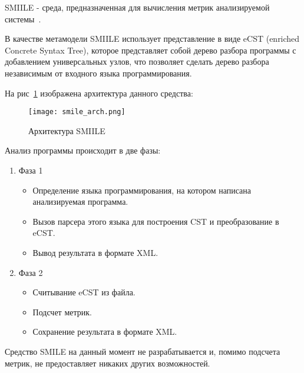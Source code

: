 

SMIILE - среда, предназначенная для вычисления метрик анализируемой
системы~\cite{smile}.

В качестве метамодели SMIILE использует представление в виде eCST (enriched
Concrete Syntax Tree), которое представляет собой дерево разбора программы с
добавлением универсальных узлов, что позволяет сделать дерево разбора
независимым от входного языка программирования.

На рис~\ref{fig:smile_arch} изображена архитектура данного средства:

\begin{figure}[ht!]
    \begin{center}
        \texttt{[image: smile\_arch.png]}
    \end{center}
    \caption{Архитектура SMIILE}
    \label{fig:smile_arch}
\end{figure}

Анализ программы происходит в две фазы:

\begin{enumerate}
    \item Фаза 1
    \begin{itemize}
        \item Определение языка программирования, на котором написана
        анализируемая программа.
        \item Вызов парсера этого языка для построения CST и преобразование в
        eCST.
        \item Вывод результата в формате XML.
    \end{itemize}

    \item Фаза 2
    \begin{itemize}
        \item Считывание eCST из файла.
        \item Подсчет метрик.
        \item Сохранение результата в формате XML.
    \end{itemize}
\end{enumerate}

Средство SMILE на данный момент не разрабатывается и, помимо подсчета метрик, не
предоставляет никаких других возможностей.


